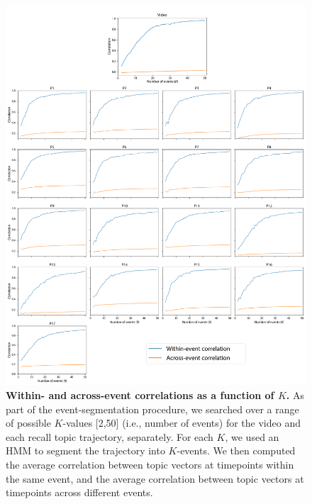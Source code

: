 \documentclass{article}
\begin{document}
\begin{figure}[p!]
\centering
\includegraphics[width=\textwidth]{figs/k_corrs}
\caption{\small \textbf{Within- and across-event correlations as a function of $K$.}  As part of the event-segmentation procedure, we searched over a range of possible $K$-values [2,50] (i.e., number of events) for the video and each recall topic trajectory, separately.  For each $K$, we used an HMM to segment the trajectory into $K$-events. We then computed the average correlation between topic vectors at timepoints within the same event, and the average correlation between topic vectors at timepoints across different events.}
\label{fig:k_corrs}
\end{figure}
\end{document}
